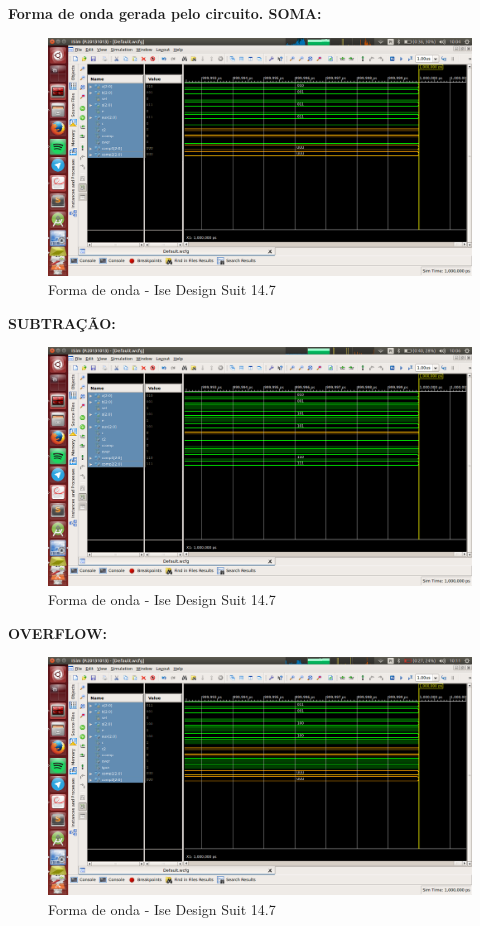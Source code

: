 \documentclass[12pts]{article}
\begin{document}
\textbf{Forma de onda gerada pelo circuito. SOMA:}

\begin{figure}[!htb]
  \centering
  \includegraphics[scale=0.3	]{imagens/soma}
  \caption{Forma de onda - Ise Design Suit 14.7}
  \label{figRotulo}
\end{figure}

\newpage
\textbf{SUBTRAÇÃO:}
\begin{figure}[!htb]
  \centering
  \includegraphics[scale=0.3	]{imagens/sub}
  \caption{Forma de onda - Ise Design Suit 14.7}
  \label{figRotulo}
\end{figure}

\newpage
\textbf{OVERFLOW:}
\begin{figure}[!htb]
  \centering
  \includegraphics[scale=0.3	]{imagens/overflow}
  \caption{Forma de onda - Ise Design Suit 14.7}
  \label{figRotulo}
\end{figure}
\end{document}
